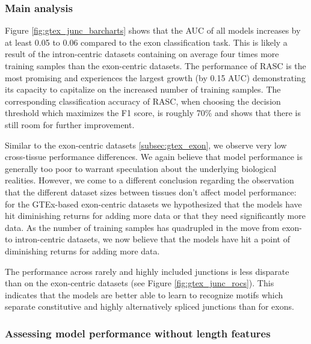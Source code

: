 \subsubsection{Main analysis}
Figure \ref{fig:gtex_junc_barcharts} shows that the AUC of all models increases by at least 0.05 to 0.06 compared to the exon classification task. This is likely a result of the intron-centric datasets containing on average four times more training samples than the exon-centric datasets. The performance of RASC is the most promising and experiences the largest growth (by 0.15 AUC) demonstrating its capacity to capitalize on the increased number of training samples. The corresponding classification accuracy of RASC, when choosing the decision threshold which maximizes the F1 score, is roughly 70\% and shows that there is still room for further improvement. 

Similar to the exon-centric datasets \ref{subsec:gtex_exon}, we observe very low cross-tissue performance differences. We again believe that model performance is generally too poor to warrant speculation about the underlying biological realities. However, we come to a different conclusion regarding the observation that the different dataset sizes between tissues don't affect model performance:
for the GTEx-based exon-centric datasets we hypothesized that the models have hit diminishing returns for adding more data or that they need significantly more data. As the number of training samples has quadrupled in the move from exon- to intron-centric datasets, we now believe that the models have hit a point of diminishing returns for adding more data. 



The performance across rarely and highly included junctions is less disparate than on the exon-centric datasets (see Figure \ref{fig:gtex_junc_rocs}). This indicates that the models are better able to learn to recognize motifs which separate constitutive and highly alternatively spliced junctions than for exons.

\subsubsection{Assessing model performance without length features}

